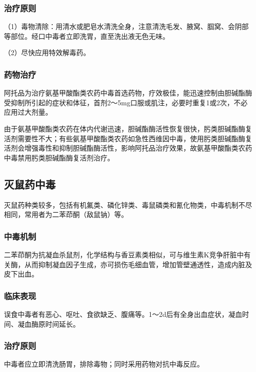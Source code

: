 \subsubsection{治疗原则}

（1）毒物清除：用清水或肥皂水清洗全身，注意清洗毛发、腋窝、腘窝、会阴部等部位。经口中毒者立即洗胃，直至洗出液无色无味。

（2）尽快应用特效解毒药。

\subsubsection{药物治疗}

阿托品为治疗氨基甲酸酯类农药中毒首选药物，疗效极佳，能迅速控制由胆碱酯酶受抑制所引起的症状和体征，首剂2～5mg口服或肌注，必要时重复1或2次，不必应用过大剂量。

由于氨基甲酸酯类农药在体内代谢迅速，胆碱酯酶活性恢复很快，肟类胆碱酯酶复活剂需要性不大；有些氨基甲酸酯类农药如急性西维因中毒，使用肟类胆碱酯酶复活剂会增强毒性和抑制胆碱酯酶活性，影响阿托品治疗效果，故氨基甲酸酯类农药中毒禁用肟类胆碱酯酶复活剂治疗。

\subsection{灭鼠药中毒}

灭鼠药种类较多，包括有机氟类、磷化锌类、毒鼠磷类和氰化物类，中毒机制不尽相同，常用者为二苯茚酮（敌鼠钠）等。

\subsubsection{中毒机制}

二苯茚酮为抗凝血杀鼠剂，化学结构与香豆素类相似，可与维生素K竞争肝脏中有关酶，从而抑制凝血因子生成，亦可损伤毛细血管，增加管壁通透性，造成内脏及皮下出血。

\subsubsection{临床表现}

误食中毒者有恶心、呕吐、食欲缺乏、腹痛等。1～2d后有全身出血症状，凝血时间、凝血酶原时间延长。

\subsubsection{治疗原则}

中毒者应立即清洗肠胃，排除毒物；同时采用药物对抗中毒反应。

